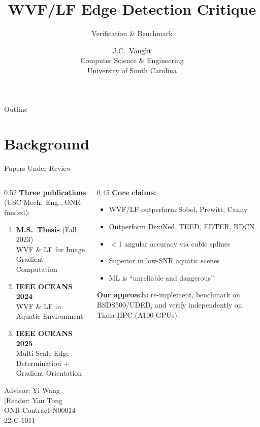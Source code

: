 \documentclass[10pt, aspectratio=169]{beamer}
\title[WVF/LF Critique]{WVF/LF Edge Detection Critique}
\subtitle{Verification \& Benchmark}
\author[J.C.\ Vaught]{J.C.\ Vaught\texorpdfstring{\\}{, }Computer Science \& Engineering\texorpdfstring{\\}{, }University of South Carolina}
\institute[UofSC]{}
\date{}
\begin{document}
{
  \begin{frame}[plain]
    \titlepage
  \end{frame}
}

\begin{frame}{Outline}
  \tableofcontents
\end{frame}

\sectionsubtitle{}
\section{Background}

\begin{frame}{Papers Under Review}
  \begin{columns}[T]
    \begin{column}{0.52\textwidth}
      \textbf{Three publications} (USC Mech.\ Eng., ONR-funded):
      \vspace{0.3em}
      \begin{enumerate}
        \item \textbf{M.S.\ Thesis} (Fall 2023)\\
              {\small WVF \& LF for Image Gradient Computation}
        \item \textbf{IEEE OCEANS 2024}\\
              {\small WVF \& LF in Aquatic Environment}
        \item \textbf{IEEE OCEANS 2025}\\
              {\small Multi-Scale Edge Determination + Gradient Orientation}
      \end{enumerate}
      \vspace{0.3em}
      {\small Advisor: Yi Wang \quad|\quad Reader: Yan Tong}\\
      {\small ONR Contract N00014-22-C-1011}
    \end{column}
    \begin{column}{0.45\textwidth}
      \textbf{Core claims:}
      \begin{itemize}
        \item WVF/LF outperform Sobel, Prewitt, Canny
        \item Outperform DexiNed, TEED, EDTER, BDCN
        \item $<$1\textdegree{} angular accuracy via cubic splines
        \item Superior in low-SNR aquatic scenes
        \item ML is ``unreliable and dangerous''
      \end{itemize}
      \vspace{0.3em}
      \textbf{Our approach:} re-implement, benchmark on BSDS500/UDED, and verify independently on Theia HPC (A100 GPUs).
    \end{column}
  \end{columns}
\end{frame}
\end{document}
